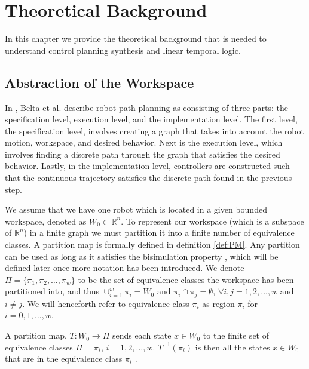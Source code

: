 \chapter{Theoretical Background}
In this chapter we provide the theoretical background that is needed to understand control planning synthesis and linear temporal logic. 
\section{Abstraction of the Workspace}
In \cite{belta07}, Belta et al. describe robot path planning as consisting of three parts: the specification level, execution level, and the implementation level. The first level, the specification level, involves creating a graph that takes into account the robot motion, workspace, and desired behavior. Next is the execution level, which involves finding a discrete path through the graph that satisfies the desired behavior. Lastly, in the implementation level, controllers are constructed such that the continuous trajectory satisfies the discrete path found in the previous step. 

We assume that we have one robot which is located in a given bounded workspace, denoted as $W_0 \subset \mathbb{R}^n$. To represent our workspace (which is a subspace of $\mathbb{R}^n$) in a finite graph we must partition it into a finite number of equivalence classes. A partition map is formally defined in definition \ref{def:PM}. Any partition can be used as long as it satisfies the bisimulation property \cite{belta04}, which will be defined later once more notation has been introduced. We denote $\Pi = \{\pi_1, \pi_2, \dots, \pi_w\}$ to be the set of equivalence classes the workspace has been partitioned into, and thus $\cup_{i=1}^w \pi_i = W_0$ and $\pi_i \cap \pi_j = \emptyset$, $\forall i,j=1,2,\dots,w$ and $i\neq j$. We will henceforth refer to equivalence class $\pi_i$ as region $\pi_i$ for $i = 0,1,\dots, w$. 

\begin{definition}
\label{def:PM}
A partition map, $T: W_0 \rightarrow \Pi$ sends each state $x \in W_0$ to the finite set of equivalence classes $\Pi = {\pi_i}$,  $i = 1,2,\dots ,w$. $T^{-1}(\pi_i)$ is then all the states $x \in W_0$ that are in the equivalence class $\pi_i$ \cite{fainekos05}. 
\end{definition} 

